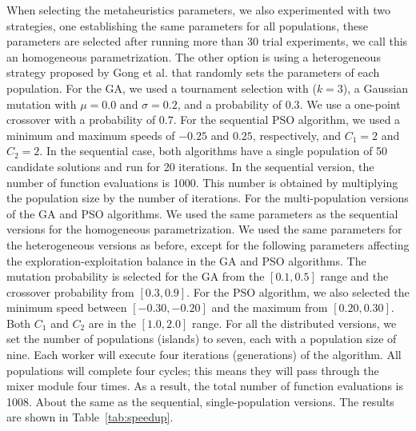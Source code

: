 \documentclass[runningheads]{llncs}
\begin{document}
When selecting the metaheuristics parameters, we also experimented with two
strategies, one establishing the same parameters for all populations, these
parameters are selected after running more than 30 trial experiments, we call
this an homogeneous parametrization. The other option is using a heterogeneous
strategy proposed by Gong et al. \cite{gong2011distributed} that randomly sets
the parameters of each population. For the GA, we used a tournament selection
with ($k=3$), a Gaussian mutation with $\mu = 0.0$ and $\sigma = 0.2$, and a
probability of $0.3$. We use a one-point crossover with a probability of $0.7$.
For the sequential PSO algorithm, we used a minimum and maximum speeds of
$-0.25$ and $0.25$, respectively, and $C_1=2$ and $C_2=2$. In the sequential
case, both algorithms have a single population of 50 candidate solutions and
run for 20 iterations. In the sequential version, the number of function
evaluations is 1000. This number is obtained by multiplying the population size
by the number of iterations. For the multi-population versions of the GA and
PSO algorithms. We used the same parameters as the sequential versions for the
homogeneous parametrization. We used the same parameters for the heterogeneous
versions as before, except for the following parameters affecting the
exploration-exploitation balance in the GA and PSO algorithms. The mutation
probability is selected for the GA from the $[0.1,0.5]$ range and the crossover
probability from $[0.3,0.9]$. For the PSO algorithm, we also selected the
minimum speed between $[-0.30,-0.20]$ and the maximum from $[0.20,0.30]$. Both
$C_1$ and $C_2$ are in the $[1.0,2.0]$ range. For all the distributed versions,
we set the number of populations (islands) to seven, each with a population
size of nine. Each worker will execute four iterations (generations) of the
algorithm. All populations will complete four cycles; this means they will pass
through the mixer module four times. As a result, the total number of function
evaluations is 1008. About %
the same as the sequential, single-population
versions. The results are shown in Table~\ref{tab:speedup}.
\end{document}
